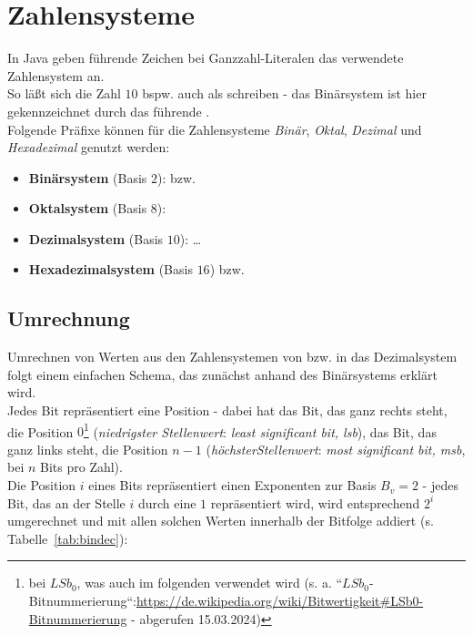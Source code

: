 
\section{Zahlensysteme}

In Java geben führende Zeichen bei Ganzzahl-Literalen das verwendete Zahlensystem an.\\

\noindent
So läßt sich die Zahl $10$ bspw. auch als  schreiben - das Binärsystem ist hier gekennzeichnet durch das führende .\\

\noindent
Folgende Präfixe können für die Zahlensysteme \textit{Binär}, \textit{Oktal}, \textit{Dezimal} und \textit{Hexadezimal} genutzt werden:

\begin{itemize}
    \item \textbf{Binärsystem} (Basis $2$):  bzw. 
    \item \textbf{Oktalsystem} (Basis $8$): 
    \item \textbf{Dezimalsystem} (Basis $10$):  \ldots {}
    \item \textbf{Hexadezimalsystem} (Basis $16$)  bzw. 
\end{itemize}

\subsection{Umrechnung}

Umrechnen von Werten aus den Zahlensystemen von bzw. in das  Dezimalsystem folgt einem einfachen Schema, das zunächst anhand des Binärsystems erklärt wird.\\

\noindent
Jedes Bit repräsentiert eine Position - dabei hat das Bit, das ganz rechts steht, die Position $0$\footnote{
bei $LSb_0$, was auch im folgenden verwendet wird (s. a. ``$LSb_0$-Bitnummerierung``:\url{https://de.wikipedia.org/wiki/Bitwertigkeit#LSb0-Bitnummerierung} - abgerufen 15.03.2024)
} (\textit{niedrigster Stellenwert}: \textit{least significant bit, lsb}), das Bit, das ganz links steht, die Position $n-1$ (\textit{höchsterStellenwert}: \textit{most significant bit, msb}, bei $n$ Bits pro Zahl).\\
Die Position $i$ eines Bits repräsentiert einen Exponenten zur Basis $B_v=2$ - jedes Bit, das an der Stelle $i$ durch eine $1$ repräsentiert wird, wird entsprechend $2^i$ umgerechnet und mit allen solchen Werten innerhalb der Bitfolge addiert (s. Tabelle~\ref{tab:bindec}):


